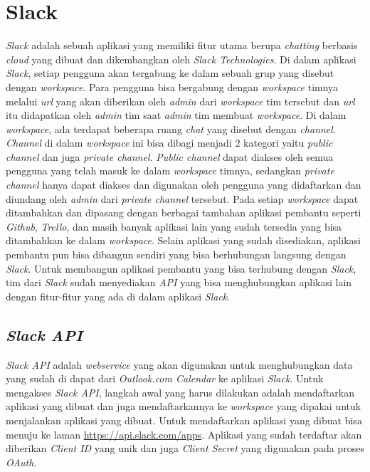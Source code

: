 \section{Slack}
\label{sec:slack}
\textit{Slack} adalah sebuah aplikasi yang memiliki fitur utama berupa \textit{chatting} berbasis \textit{cloud} yang dibuat dan dikembangkan oleh \textit{Slack Technologies}. Di dalam aplikasi \textit{Slack}, setiap pengguna akan tergabung ke dalam sebuah grup yang disebut dengan \textit{workspace}. Para pengguna bisa bergabung dengan \textit{workspace} timnya melalui \textit{url} yang akan diberikan oleh \textit{admin} dari \textit{workspace} tim tersebut dan \textit{url} itu didapatkan oleh \textit{admin} tim saat \textit{admin} tim membuat \textit{workspace}. Di dalam \textit{workspace}, ada terdapat beberapa ruang \textit{chat} yang disebut dengan \textit{channel}. \textit{Channel} di dalam \textit{workspace} ini bisa dibagi menjadi 2 kategori yaitu \textit{public channel} dan juga \textit{private channel}. \textit{Public channel} dapat diakses oleh semua pengguna yang telah masuk ke dalam \textit{workspace} timnya, sedangkan \textit{private channel} hanya dapat diakses dan digunakan oleh pengguna yang didaftarkan dan diundang oleh \textit{admin} dari \textit{private channel} tersebut. Pada setiap \textit{workspace} dapat ditambahkan dan dipasang dengan berbagai tambahan aplikasi pembantu seperti \textit{Github}, \textit{Trello}, dan masih banyak aplikasi lain yang sudah tersedia yang bisa ditambahkan ke dalam \textit{workspace}. Selain aplikasi yang sudah disediakan, aplikasi pembantu pun bisa dibangun sendiri yang bisa berhubungan langsung dengan \textit{Slack}. Untuk membangun aplikasi pembantu yang bisa terhubung dengan \textit{Slack}, tim dari \textit{Slack} sudah menyediakan \textit{API} yang bisa menghubungkan aplikasi lain dengan fitur-fitur yang ada di dalam aplikasi \textit{Slack}. 

\subsection{\textit{Slack API}}
\label{sec:slackAPI}
\textit{Slack API} adalah \textit{webservice} yang akan digunakan untuk menghubungkan data yang sudah di dapat dari \textit{Outlook.com Calendar} ke aplikasi \textit{Slack}.\cite{slack} Untuk mengakses \textit{Slack API}, langkah awal yang harus dilakukan adalah mendaftarkan aplikasi yang dibuat dan juga mendaftarkannya ke \textit{workspace} yang dipakai untuk menjalankan aplikasi yang dibuat. Untuk mendaftarkan aplikasi yang dibuat bisa menuju ke laman \url{https://api.slack.com/apps}. Aplikasi yang sudah terdaftar akan diberikan \textit{Client ID} yang unik dan juga \textit{Client Secret} yang digunakan pada proses \textit{OAuth}. 

